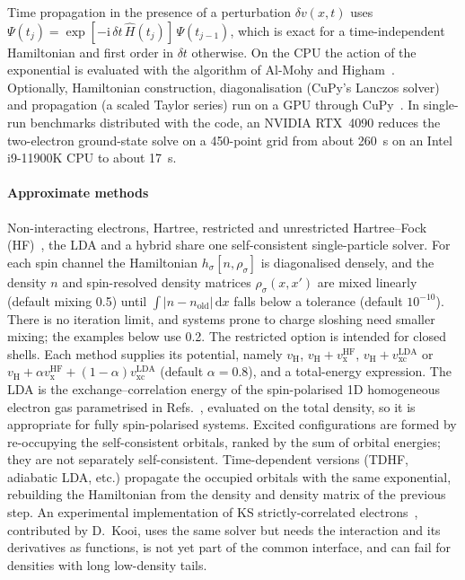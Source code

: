 \documentclass[5p,times,twocolumn]{elsarticle}
\newcommand{\vxc}{v_\mathrm{xc}}
\newcommand{\vH}{v_\mathrm{H}}
\begin{document}
Time propagation in the presence of a perturbation $\delta v(x,t)$ uses
$\Psi(t_{j})=\exp[-\mathrm{i}\,\delta t\,\hat H(t_{j})]\,\Psi(t_{j-1})$,
which is exact for a time-independent Hamiltonian and first order in $\delta t$ otherwise. On the CPU the action of the exponential is evaluated with the algorithm of Al-Mohy and Higham~\cite{AlMohy2011}. Optionally, Hamiltonian construction, diagonalisation (CuPy's Lanczos solver) and propagation (a scaled Taylor series) run on a GPU through CuPy~\cite{CuPy}. In single-run benchmarks distributed with the code, an NVIDIA RTX~4090 reduces the two-electron ground-state solve on a 450-point grid from about 260~s on an Intel i9-11900K CPU to about 17~s.

\paragraph{Approximate methods}
Non-interacting electrons, Hartree, restricted and unrestricted Hartree--Fock (HF)~\cite{Fock1930}, the LDA and a hybrid share one self-consistent single-particle solver. For each spin channel the Hamiltonian $h_\sigma[n,\rho_\sigma]$ is diagonalised densely, and the density $n$ and spin-resolved density matrices $\rho_\sigma(x,x')$ are mixed linearly (default mixing 0.5) until $\int|n-n_\mathrm{old}|\,\mathrm{d}x$ falls below a tolerance (default $10^{-10}$). There is no iteration limit, and systems prone to charge sloshing need smaller mixing; the examples below use 0.2. The restricted option is intended for closed shells. Each method supplies its potential, namely $\vH$, $\vH+v_\mathrm{x}^\mathrm{HF}$, $\vH+\vxc^\mathrm{LDA}$ or $\vH+\alpha v_\mathrm{x}^\mathrm{HF}+(1-\alpha)\vxc^\mathrm{LDA}$ (default $\alpha=0.8$), and a total-energy expression. The LDA is the exchange--correlation energy of the spin-polarised 1D homogeneous electron gas parametrised in Refs.~\cite{Entwistle2016,Entwistle2018}, evaluated on the total density, so it is appropriate for fully spin-polarised systems. Excited configurations are formed by re-occupying the self-consistent orbitals, ranked by the sum of orbital energies; they are not separately self-consistent. Time-dependent versions (TDHF, adiabatic LDA, etc.) propagate the occupied orbitals with the same exponential, rebuilding the Hamiltonian from the density and density matrix of the previous step. An experimental implementation of KS strictly-correlated electrons~\cite{Malet2012,Malet2013,Mirtschink2013,Marie2022}, contributed by D.~Kooi, uses the same solver but needs the interaction and its derivatives as functions, is not yet part of the common interface, and can fail for densities with long low-density tails.
\end{document}

